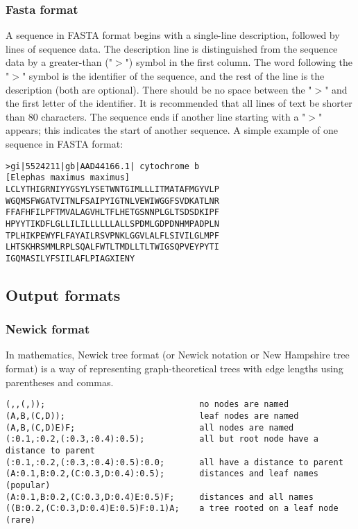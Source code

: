 \subsubsection{Fasta format \cite{fasta}}
A sequence in FASTA format begins with a single-line description, 
followed by lines of sequence data. The description line is 
distinguished from the sequence data by a greater-than ("$>$") 
symbol in the first column. The word following the "$>$" symbol 
is the identifier of the sequence, and the rest of the line is 
the description (both are optional). There should be no space 
between the "$>$" and the first letter of the identifier. 
It is recommended that all lines of text be shorter than 80 
characters. The sequence ends if another line starting 
with a "$>$" appears; this indicates the start of another 
sequence. A simple example of one sequence in FASTA format:
\begin{lstlisting}
>gi|5524211|gb|AAD44166.1| cytochrome b 
[Elephas maximus maximus]
LCLYTHIGRNIYYGSYLYSETWNTGIMLLLITMATAFMGYVLP
WGQMSFWGATVITNLFSAIPYIGTNLVEWIWGGFSVDKATLNR
FFAFHFILPFTMVALAGVHLTFLHETGSNNPLGLTSDSDKIPF
HPYYTIKDFLGLLILILLLLLLALLSPDMLGDPDNHMPADPLN
TPLHIKPEWYFLFAYAILRSVPNKLGGVLALFLSIVILGLMPF
LHTSKHRSMMLRPLSQALFWTLTMDLLTLTWIGSQPVEYPYTI
IGQMASILYFSIILAFLPIAGXIENY
\end{lstlisting}

\subsection{Output formats}

\subsubsection{Newick format \cite{newick}}
In mathematics, Newick tree format (or Newick notation or 
New Hampshire tree format) is a way of representing graph-theoretical 
trees with edge lengths using parentheses and commas. 

\begin{lstlisting}
(,,(,));                               no nodes are named
(A,B,(C,D));                           leaf nodes are named
(A,B,(C,D)E)F;                         all nodes are named
(:0.1,:0.2,(:0.3,:0.4):0.5);           all but root node have a distance to parent
(:0.1,:0.2,(:0.3,:0.4):0.5):0.0;       all have a distance to parent
(A:0.1,B:0.2,(C:0.3,D:0.4):0.5);       distances and leaf names (popular)
(A:0.1,B:0.2,(C:0.3,D:0.4)E:0.5)F;     distances and all names
((B:0.2,(C:0.3,D:0.4)E:0.5)F:0.1)A;    a tree rooted on a leaf node (rare)
\end{lstlisting}

